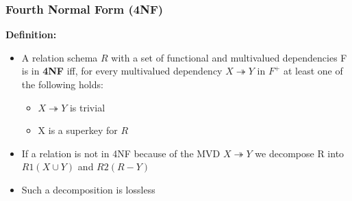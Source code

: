 \subsubsection{Fourth Normal Form (4NF)}

\textbf{Definition:}
\begin{itemize}
    \item A relation schema $R$ with a set of functional and multivalued dependencies F is in \textbf{4NF} iff, for every multivalued dependency $X \twoheadrightarrow Y$ in $F^+$ at least one of the following holds:
    \begin{itemize}
        \item $X\twoheadrightarrow Y$ is trivial
        \item X is a superkey for $R$
    \end{itemize}
    \item If a relation is not in 4NF because of the MVD $X \twoheadrightarrow Y$ we decompose R into $R1(X\cup Y)$ and $R2(R-Y)$
    \item Such a decomposition is lossless
\end{itemize}

